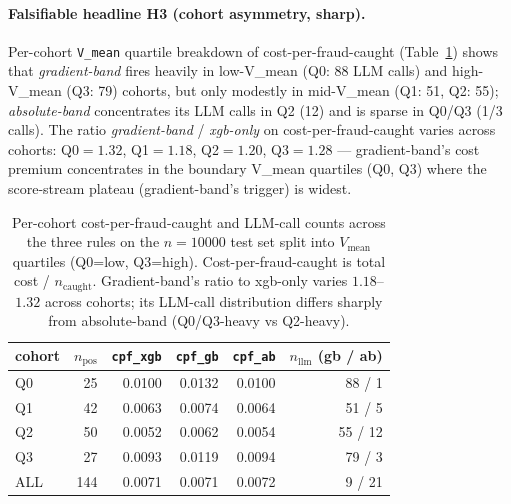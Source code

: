 \paragraph{Falsifiable headline H3 (cohort asymmetry, sharp).}
Per-cohort \texttt{V\_mean} quartile breakdown of cost-per-fraud-caught
(Table~\ref{tab:p8-cost-cohort}) shows that
\textit{gradient-band} fires heavily in low-V\_mean (Q0: 88 LLM calls)
and high-V\_mean (Q3: 79) cohorts, but only modestly in mid-V\_mean
(Q1: 51, Q2: 55); \textit{absolute-band} concentrates its LLM calls in
Q2 (12) and is sparse in Q0/Q3 (1/3 calls). The ratio
\textit{gradient-band} / \textit{xgb-only} on cost-per-fraud-caught
varies across cohorts: Q0$=1.32$, Q1$=1.18$, Q2$=1.20$, Q3$=1.28$
--- gradient-band's cost premium concentrates in the boundary V\_mean
quartiles (Q0, Q3) where the score-stream plateau (gradient-band's
trigger) is widest.

\begin{table}[t]
\centering
\caption{Per-cohort cost-per-fraud-caught and LLM-call counts across
the three rules on the $n{=}10000$ test set split into $V_\mathrm{mean}$
quartiles (Q0=low, Q3=high). Cost-per-fraud-caught is total cost /
$n_\mathrm{caught}$. Gradient-band's ratio to xgb-only varies $1.18$--$1.32$
across cohorts; its LLM-call distribution differs sharply from absolute-band
(Q0/Q3-heavy vs Q2-heavy).}
\label{tab:p8-cost-cohort}
\small
\begin{tabular}{lrrrrr}
\toprule
cohort & $n_\mathrm{pos}$ & \texttt{cpf\_xgb} & \texttt{cpf\_gb} & \texttt{cpf\_ab} &
$n_\mathrm{llm}$ (gb / ab) \\
\midrule
Q0 & 25 & 0.0100 & 0.0132 & 0.0100 & 88 / 1 \\
Q1 & 42 & 0.0063 & 0.0074 & 0.0064 & 51 / 5 \\
Q2 & 50 & 0.0052 & 0.0062 & 0.0054 & 55 / 12 \\
Q3 & 27 & 0.0093 & 0.0119 & 0.0094 & 79 / 3 \\
\midrule
ALL & 144 & 0.0071 & 0.0071 & 0.0072 & 9 / 21 \\
\bottomrule
\end{tabular}
\end{table}

